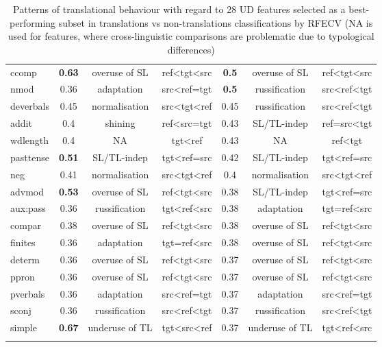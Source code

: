 \begin{longtable}[H]{p{1.6cm}|ccc||ccc}
	ccomp   & \textbf{0.63} & overuse of SL  & ref\textless{}tgt\textless{}src & \textbf{0.5}  & overuse of SL & ref\textless{}tgt\textless{}src \\
	nmod & 0.36 & adaptation  & src\textless{}ref=tgt  & \textbf{0.5}  & russification & src\textless{}ref\textless{}tgt \\
	deverbals  & 0.45 & normalisation  & src\textless{}tgt\textless{}ref & 0.45 & russification & src\textless{}ref\textless{}tgt \\
	addit   & 0.4  & shining  & ref\textless{}src=tgt  & 0.43 & SL/TL-indep   & ref=src\textless{}tgt  \\
	wdlength   & 0.4  & NA  & tgt\textless{}ref & 0.43 & NA & ref\textless{}tgt \\
	pasttense  & \textbf{0.51} & SL/TL-indep & tgt\textless{}ref=src  & 0.42 & SL/TL-indep   & tgt\textless{}ref=src  \\
	neg  & 0.41 & normalisation  & src\textless{}tgt\textless{}ref & 0.4  & normalisation & src\textless{}tgt\textless{}ref \\
	advmod  & \textbf{0.53} & overuse of SL  & ref\textless{}tgt\textless{}src & 0.38 & SL/TL-indep   & tgt\textless{}ref=src  \\
	aux:pass   & 0.36 & russification  & tgt\textless{}ref\textless{}src & 0.38 & adaptation & tgt=ref\textless{}src  \\
	compar  & 0.38 & overuse of SL  & ref\textless{}tgt\textless{}src & 0.38 & overuse of SL & ref\textless{}tgt\textless{}src \\
	finites & 0.36 & adaptation  & tgt=ref\textless{}src  & 0.38 & overuse of SL & ref\textless{}tgt\textless{}src \\
	determ  & 0.36 & overuse of SL  & ref\textless{}tgt\textless{}src & 0.37 & overuse of SL & ref\textless{}tgt\textless{}src \\
	ppron   & 0.36 & overuse of SL  & ref\textless{}tgt\textless{}src & 0.37 & overuse of SL & ref\textless{}tgt\textless{}src \\
	pverbals   & 0.36 & adaptation  & src\textless{}ref=tgt  & 0.37 & adaptation & src\textless{}ref=tgt  \\
	sconj   & 0.36 & russification  & src\textless{}ref\textless{}tgt & 0.37 & russification & src\textless{}ref\textless{}tgt \\
	simple  & \textbf{0.67} & underuse of TL & tgt\textless{}src\textless{}ref & 0.37 & underuse of TL & tgt\textless{}ref\textless{}src \\
	\bottomrule
	\caption{\label{tab:shared_rfecv_feats}Patterns of translational behaviour with regard to 28 UD features selected as a best-performing subset in translations vs non-translations classifications by RFECV (NA is used for features, where cross-linguistic comparisons are problematic due to typological differences)}\\
\end{longtable}
